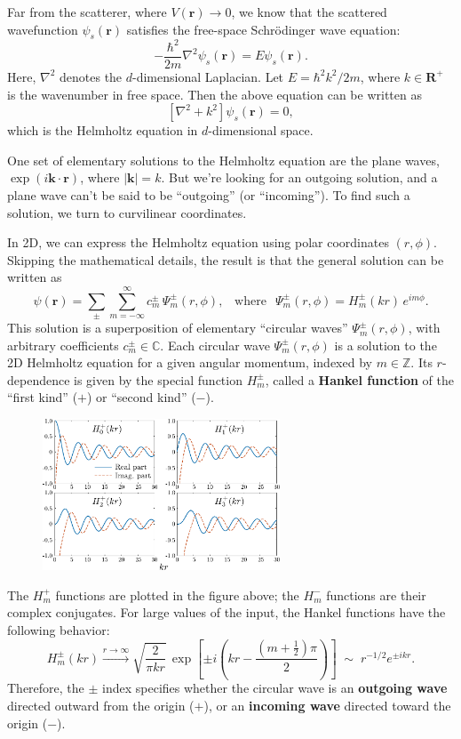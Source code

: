 \documentclass[pra,12pt]{revtex4}
\begin{document}
Far from the scatterer, where $V(\mathbf{r})\rightarrow 0$, we know
that the scattered wavefunction $\psi_s(\mathbf{r})$ satisfies the
free-space Schr\"odinger wave equation:
$$-\frac{\hbar^2}{2m} \nabla^2 \psi_s(\mathbf{r}) = E \psi_s(\mathbf{r}).$$
Here, $\nabla^2$ denotes the $d$-dimensional Laplacian.  Let $E =
\hbar^2 k^2 / 2m$, where $k \in \mathbf{R}^+$ is the wavenumber in
free space.  Then the above equation can be written as
$$\left[\nabla^2 + k^2\right] \psi_s(\mathbf{r}) = 0,$$
which is the Helmholtz equation in $d$-dimensional space.

One set of elementary solutions to the Helmholtz equation are the
plane waves, $\exp(i\mathbf{k}\cdot\mathbf{r})$, where $|\mathbf{k}| =
k$.  But we're looking for an outgoing solution, and a plane wave
can't be said to be ``outgoing'' (or ``incoming'').  To find such a
solution, we turn to curvilinear coordinates.

In 2D, we can express the Helmholtz equation using polar coordinates
$(r,\phi)$.  Skipping the mathematical details, the result is that the
general solution can be written as
$$\psi(\mathbf{r})=\sum_{\pm}\sum_{m=-\infty}^\infty c_m^\pm\,\Psi_m^\pm(r,\phi), \;\;\;\mathrm{where}\;\;\,\Psi_m^\pm(r,\phi) = H_m^\pm(kr)\,e^{im\phi}.$$
This solution is a superposition of elementary ``circular waves''
$\Psi_m^\pm(r,\phi)$, with arbitrary coefficients $c_m^\pm \in
\mathbb{C}$.  Each circular wave $\Psi_m^\pm(r,\phi)$ is a solution to
the 2D Helmholtz equation for a given angular momentum, indexed by $m
\in \mathbb{Z}$.  Its $r$-dependence is given by the special function
$H_m^\pm$, called a \textbf{Hankel function} of the ``first kind''
($+$) or ``second kind'' ($-$).

\begin{figure}[h!]
  \centering\includegraphics[width=0.63\textwidth]{besselh}
\end{figure}

The $H^+_m$ functions are plotted in the figure above; the $H^-_m$
functions are their complex conjugates.  For large values of the
input, the Hankel functions have the following behavior:
$$H_m^\pm(kr) \overset{r\rightarrow\infty}{\longrightarrow} \sqrt{\frac{2}{\pi kr}} \, \exp\left[\pm i\left(kr - \frac{(m+\frac{1}{2})\pi}{2}\right)\right] \;\sim\; r^{-1/2} e^{\pm ikr}.$$
Therefore, the $\pm$ index specifies whether the circular wave is an
\textbf{outgoing wave} directed outward from the origin ($+$), or an
\textbf{incoming wave} directed toward the origin ($-$).
\end{document}
